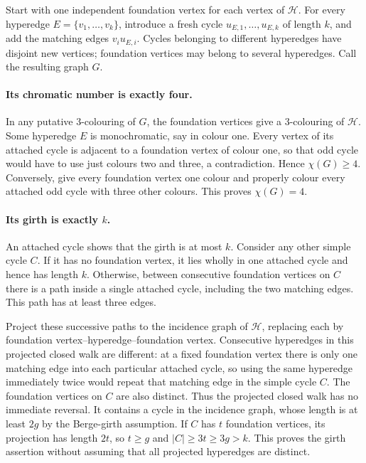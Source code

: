 Start with one independent foundation vertex for each vertex
of \(\mathcal H\). For every hyperedge
\(E=\{v_1,\ldots,v_k\}\), introduce a fresh cycle
\(u_{E,1},\ldots,u_{E,k}\) of length \(k\), and add the matching
edges \(v_i u_{E,i}\).
Cycles belonging to different hyperedges have disjoint new
vertices; foundation vertices may belong to several hyperedges.
Call the resulting graph \(G\).

\paragraph{Its chromatic number is exactly four.}
In any putative \(3\)-colouring of \(G\), the foundation
vertices give a \(3\)-colouring of \(\mathcal H\). Some
hyperedge \(E\) is monochromatic, say in colour one.
Every vertex of its attached cycle is adjacent to a
foundation vertex of colour one, so that odd cycle would
have to use just colours two and three, a contradiction.
Hence \(\chi(G)\geq4\).
Conversely, give every foundation vertex one colour and
properly colour every attached odd cycle with three
other colours. This proves \(\chi(G)=4\).

\paragraph{Its girth is exactly \(k\).}
An attached cycle shows that the girth is at most \(k\).
Consider any other simple cycle \(C\).
If it has no foundation vertex, it lies wholly in one
attached cycle and hence has length \(k\).
Otherwise, between consecutive foundation vertices on
\(C\) there is a path inside a single attached cycle,
including the two matching edges. This path has at least
three edges.

Project these successive paths to the incidence graph of
\(\mathcal H\), replacing each by
foundation vertex--hyperedge--foundation vertex.
Consecutive hyperedges in this projected closed walk are
different: at a fixed foundation vertex there is only one
matching edge into each particular attached cycle, so
using the same hyperedge immediately twice would repeat
that matching edge in the simple cycle \(C\).
The foundation vertices on \(C\) are also distinct.
Thus the projected closed walk has no immediate reversal.
It contains a cycle in the incidence graph, whose length
is at least \(2g\) by the Berge-girth assumption.
If \(C\) has \(t\) foundation vertices, its projection
has length \(2t\), so \(t\geq g\) and
\(|C|\geq3t\geq3g>k\).
This proves the girth assertion without assuming that
all projected hyperedges are distinct.

